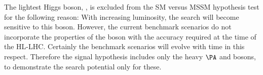 The lightest Higgs boson, \Ph, is excluded from the SM versus MSSM hypothesis test for the following reason:
With increasing luminosity, the search will become sensitive to this boson. However, the current benchmark scenarios do not
incorporate the properties of the \Ph boson with the accuracy required at the time of the HL-LHC.
Certainly the benchmark scenarios will evolve with time in this respect. Therefore the signal hypothesis includes
only the heavy $\PA$ and \PH bosons, to demonstrate the search potential only for these.